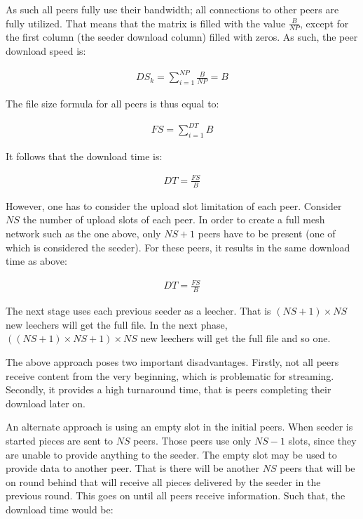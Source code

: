 As such all peers fully use their bandwidth; all connections to other peers
are fully utilized. That means that the matrix is filled with the value
$\frac{B}{NP}$, except for the first column (the seeder download column) filled
with zeros. As such, the peer download speed is:

\begin{align}
  DS_{k} = \sum_{i=1}^{NP} \frac{B}{NP} = B
\end{align}

The file size formula for all peers is thus equal to:

\begin{align}
  FS = \sum_{i=1}^{DT} B
\end{align}

It follows that the download time is:

\begin{align}
  DT = \frac{FS}{B}
\end{align}

However, one has to consider the upload slot limitation of each peer.
Consider $NS$ the number of upload slots of each peer. In order to create a
full mesh network such as the one above, only $NS+1$ peers have to be present
(one of which is considered the seeder). For these peers, it results in the
same download time as above:

\begin{align}
  DT = \frac{FS}{B}
\end{align}

The next stage uses each previous seeder as a leecher. That is $(NS+1) \times
NS$ new leechers will get the full file. In the next phase, $((NS+1) \times
NS+1) \times NS$ new leechers will get the full file and so one.

The above approach poses two important disadvantages. Firstly, not all peers
receive content from the very beginning, which is problematic for streaming.
Secondly, it provides a high turnaround time, that is peers completing their
download later on.

An alternate approach is using an empty slot in the initial peers. When
seeder is started pieces are sent to $NS$ peers. Those peers use only $NS-1$
slots, since they are unable to provide anything to the seeder. The empty slot
may be used to provide data to another peer. That is there will be another
$NS$ peers that will be on round behind that will receive all pieces delivered
by the seeder in the previous round. This goes on until all peers receive
information. Such that, the download time would be:

